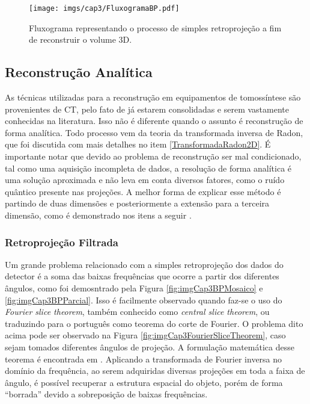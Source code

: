 \begin{figure}[H]
	\caption{Fluxograma representando o processo de simples retroprojeção a fim de reconstruir o volume \acs{3D}.}
	\begin{center}
		\texttt{[image: imgs/cap3/FluxogramaBP.pdf]}
	\end{center}
	\label{fig:imgCap3FluxogramaBP}
\end{figure}


\subsection{Reconstrução Analítica}

As técnicas utilizadas para a reconstrução em equipamentos de tomossíntese são provenientes de \acs{CT}, pelo fato de já estarem consolidadas e serem vastamente conhecidas na literatura. Isso não é diferente quando o assunto é reconstrução de forma analítica. Todo processo vem da teoria da transformada inversa de Radon, que foi discutida com mais detalhes no item \ref{TransformadaRadon2D}. É importante notar que devido ao problema de reconstrução ser mal condicionado, tal como uma aquisição incompleta de dados, a resolução de forma analítica é uma solução aproximada e não leva em conta diversos fatores, como o ruído quântico presente nas projeções. A melhor forma de explicar esse método é partindo de duas dimensões e posteriormente a extensão para a terceira dimensão, como é demonstrado nos itens a seguir \cite{mertelmeier2014filtered,xu2014tomographic}.  


\subsubsection{Retroprojeção Filtrada}\label{RetroprojeçãoFiltrada}

Um grande problema relacionado com a simples retroprojeção dos dados do detector é a soma das baixas frequências que ocorre a partir dos diferentes ângulos, como foi demosntrado pela Figura \ref{fig:imgCap3BPMosaico} e \ref{fig:imgCap3BPParcial}. Isso é facilmente observado quando faz-se o uso do \textit{Fourier slice theorem}, também conhecido como \textit{central slice theorem}, ou traduzindo para o português como teorema do corte de Fourier. O problema dito acima pode ser observado na Figura \ref{fig:imgCap3FourierSliceTheorem}, caso sejam tomados diferentes ângulos de projeção. A formulação matemática desse teorema é encontrada em . Aplicando a transformada de Fourier inversa no domínio da frequência, ao serem adquiridas diversas projeções em toda a faixa de ângulo, é possível recuperar a estrutura espacial do objeto, porém de forma ``borrada'' devido a sobreposição de baixas frequências.     

